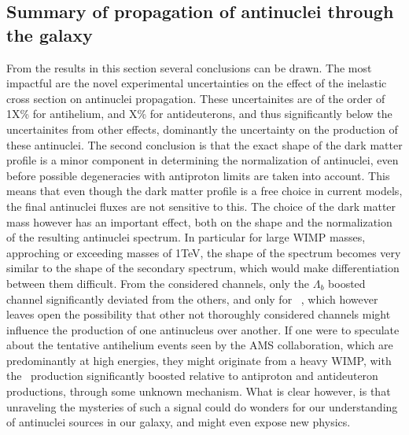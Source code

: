 \subsection{Summary of propagation of antinuclei through the galaxy}
From the results in this section several conclusions can be drawn. The most impactful are the novel experimental uncertainties on the effect of the inelastic cross section on antinuclei propagation. These uncertainites are of the order of 1X\% for antihelium, and X\% for antideuterons, and thus significantly below the uncertainites from other effects, dominantly the uncertainty on the production of these antinuclei. The second conclusion is that the exact shape of the dark matter profile is a minor component in determining the normalization of antinuclei, even before possible degeneracies with antiproton limits are taken into account. This means that even though the dark matter profile is a free choice in current models, the final antinuclei fluxes are not sensitive to this.  The choice of the dark matter mass however has an important effect, both on the shape and the normalization of the resulting antinuclei spectrum. In particular for large WIMP masses, approching or exceeding masses of 1TeV, the shape of the spectrum becomes very similar to the shape of the secondary spectrum, which would make differentiation between them difficult. From the considered channels, only the $\Lambda_b$ boosted channel significantly deviated from the others, and only for \ahe\ , which however leaves open the possibility that other not thoroughly considered channels might influence the production of one antinucleus over another. If one were to speculate about the tentative antihelium events seen by the AMS collaboration, which are predominantly at high energies, they might originate from a heavy WIMP, with the \ahe\ production significantly boosted relative to antiproton and antideuteron productions, through some unknown mechanism. What is clear however, is that unraveling the mysteries of such a signal could do wonders for our understanding of antinuclei sources in our galaxy, and might even expose new physics.   



